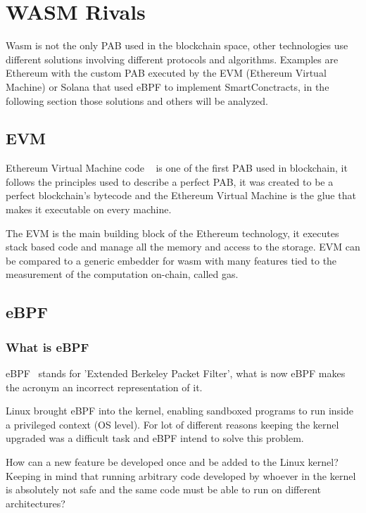 \documentclass[../main.tex]{subfiles}
\begin{document}
\section{WASM Rivals}

Wasm is not the only PAB used in the blockchain space, other technologies use different solutions involving different protocols and algorithms. Examples are Ethereum with the custom PAB executed by the EVM (Ethereum Virtual Machine) or Solana that used eBPF to implement SmartConctracts, in the following section those solutions and others will be analyzed.

\subsection{EVM}

Ethereum Virtual Machine code ~\cite{buterin2014next} is one of the first PAB used in blockchain, it follows the principles used to describe a perfect PAB, it was created to be a perfect blockchain's bytecode and the Ethereum Virtual Machine is the glue that makes it executable on every machine.

The EVM is the main building block of the Ethereum technology, it executes stack based code and manage all the memory and access to the storage. EVM can be compared to a generic embedder for wasm with many features tied to the measurement of the computation on-chain, called gas.

\subsection{eBPF}

\subsubsection{What is eBPF}

eBPF~\cite{ebpf} stands for 'Extended Berkeley Packet Filter', what is now eBPF makes the acronym an incorrect representation of it.

Linux brought eBPF into the kernel, enabling sandboxed programs to run inside a privileged context (OS level). For lot of different reasons keeping the kernel upgraded was a difficult task and eBPF intend to solve this problem.

How can a new feature be developed once and be added to the Linux kernel? Keeping in mind that running arbitrary code developed by whoever in the kernel is absolutely not safe and the same code must be able to run on different architectures?
\end{document}
